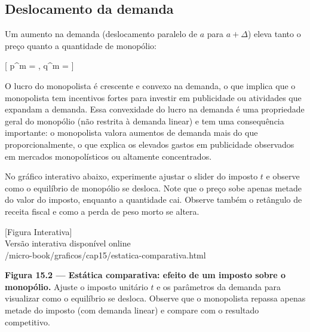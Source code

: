 \documentclass[11pt,twoside,openright]{book}
\newcommand{\figurePlaceholder}[1]{%
  \begin{center}
    \begin{tcolorbox}[
      width=0.85\textwidth,
      colback=graybg,
      colframe=gray,
      boxrule=0.5pt,
      arc=2pt,
      halign=center,
      valign=center,
      height=5cm
    ]
      \centering
      \vfill
      {\sffamily\color{gray}\large [Figura Interativa]}\\[6pt]
      {\sffamily\small\color{gray} Versão interativa disponível online}\\[4pt]
      {\ttfamily\tiny\color{gray} #1}
      \vfill
    \end{tcolorbox}
  \end{center}
}
\begin{document}
\subsection{Deslocamento da demanda}\label{deslocamento-da-demanda}

Um aumento na demanda (deslocamento paralelo de \(a\) para
\(a + \Delta\)) eleva tanto o preço quanto a quantidade de monopólio:

{[} \Delta p\^{}m = , \quad \Delta q\^{}m =
 {]}

O lucro do monopolista é crescente e convexo na demanda, o que implica
que o monopolista tem incentivos fortes para investir em publicidade ou
atividades que expandam a demanda. Essa convexidade do lucro na demanda
é uma propriedade geral do monopólio (não restrita à demanda linear) e
tem uma consequência importante: o monopolista valora aumentos de
demanda mais do que proporcionalmente, o que explica os elevados gastos
em publicidade observados em mercados monopolísticos ou altamente
concentrados.

No gráfico interativo abaixo, experimente ajustar o slider do imposto
\(t\) e observe como o equilíbrio de monopólio se desloca. Note que o
preço sobe apenas metade do valor do imposto, enquanto a quantidade cai.
Observe também o retângulo de receita fiscal e como a perda de peso
morto se altera.

\figurePlaceholder{/micro-book/graficos/cap15/estatica-comparativa.html}

\textbf{Figura 15.2 --- Estática comparativa: efeito de um imposto sobre
o monopólio.} Ajuste o imposto unitário \(t\) e os parâmetros da demanda
para visualizar como o equilíbrio se desloca. Observe que o monopolista
repassa apenas metade do imposto (com demanda linear) e compare com o
resultado competitivo.
\end{document}
